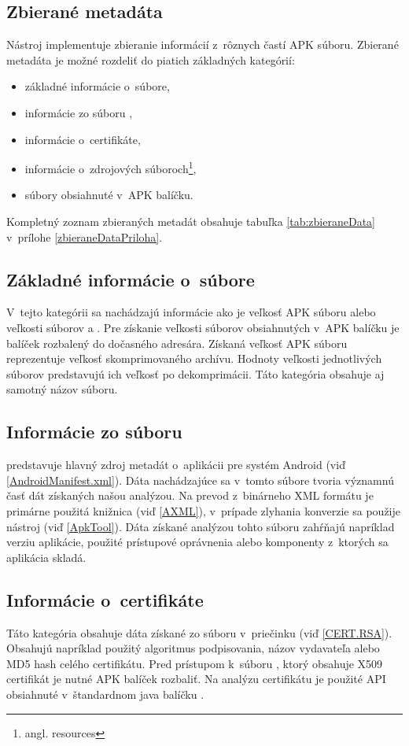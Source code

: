 \subsection{Zbierané metadáta}
Nástroj  implementuje zbieranie informácií z~rôznych častí APK súboru. Zbierané metadáta je možné rozdeliť do piatich základných kategórií:
\begin{itemize}
\item základné informácie o~súbore,
\item informácie zo súboru ,
\item informácie o~certifikáte,
\item informácie o~zdrojových súboroch\footnote{angl. resources},
\item súbory obsiahnuté v~APK balíčku.
\end{itemize}

\noindent Kompletný zoznam zbieraných metadát obsahuje tabuľka \ref{tab:zbieraneData} v~prílohe \ref{zbieraneDataPriloha}.

\subsection*{Základné informácie o~súbore} 
V~tejto kategórii sa nachádzajú informácie ako je veľkosť APK súboru alebo veľkosti súborov  a . Pre získanie veľkosti súborov obsiahnutých v~APK balíčku je balíček rozbalený do dočasného adresára. Získaná veľkosť APK súboru reprezentuje veľkosť skomprimovaného archívu. Hodnoty veľkosti jednotlivých súborov predstavujú ich veľkosť po dekomprimácii. Táto kategória obsahuje aj samotný názov súboru. 
\subsection*{Informácie zo súboru } 
 predstavuje hlavný zdroj metadát o~aplikácii pre systém Android (viď \ref{AndroidManifest.xml}). Dáta nachádzajúce sa v~tomto súbore tvoria významnú časť dát získaných našou analýzou. Na prevod z~binárneho XML formátu je primárne použitá knižnica  (viď \ref{AXML}), v~prípade zlyhania konverzie sa použije  nástroj  (viď \ref{ApkTool}). Dáta získané analýzou tohto súboru zahŕňajú napríklad verziu aplikácie, použité prístupové oprávnenia alebo komponenty z~ktorých sa aplikácia skladá.
\subsection*{Informácie o~certifikáte}
Táto kategória obsahuje dáta získané zo súboru  v~priečinku  (viď \ref{CERT.RSA}). Obsahujú napríklad použitý algoritmus podpisovania, názov vydavateľa alebo MD5 hash celého certifikátu. Pred prístupom k~súboru , ktorý obsahuje X509 certifikát je nutné APK balíček rozbaliť. Na analýzu certifikátu je použité API obsiahnuté v~štandardnom java balíčku .
